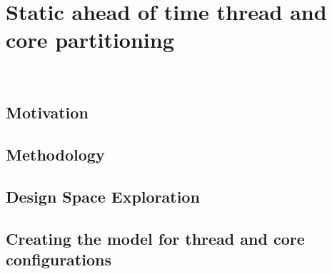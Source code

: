 %
%
%
%
%
%
%

\chapter{Static ahead of time thread and core partitioning}~\label{chp:streamit}

\label{sec:intro}


%

\section{Motivation}\label{sec:motiviation}


\section{Methodology}\label{chp:stream:sec:setup}


\section{Design Space Exploration}\label{sec:streamit:dse}


\section{Creating the model for thread and core configurations}\label{sec:ml}

\label{chp:streamit:sec:core}

